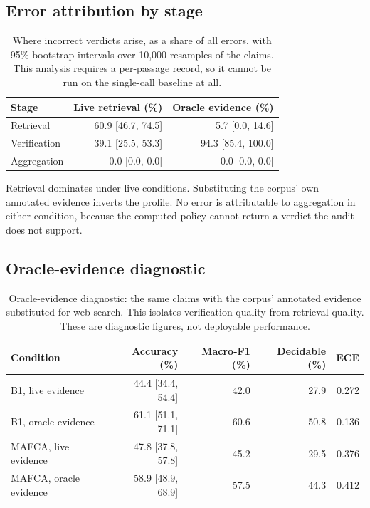 \documentclass[11pt,a4paper]{article}
\begin{document}
\subsection{Error attribution by stage}
\begin{table}[H]
\centering
\small
\caption{Where incorrect verdicts arise, as a share of all errors, with 95\% bootstrap intervals over 10,000 resamples of the claims. This analysis requires a per-passage record, so it cannot be run on the single-call baseline at all.}
\label{tab:attribution}
\begin{tabular}{@{}lrr@{}}
\toprule
\textbf{Stage} & \textbf{Live retrieval (\%)} & \textbf{Oracle evidence (\%)} \\
\midrule
Retrieval & 60.9 [46.7, 74.5] & 5.7 [0.0, 14.6] \\
Verification & 39.1 [25.5, 53.3] & 94.3 [85.4, 100.0] \\
Aggregation & 0.0 [0.0, 0.0] & 0.0 [0.0, 0.0] \\
\bottomrule
\end{tabular}
\par\vspace{2pt}\footnotesize{Retrieval dominates under live conditions. Substituting the corpus' own annotated evidence inverts the profile. No error is attributable to aggregation in either condition, because the computed policy cannot return a verdict the audit does not support.}
\end{table}
\subsection{Oracle-evidence diagnostic}
\begin{table}[H]
\centering
\small
\caption{Oracle-evidence diagnostic: the same claims with the corpus' annotated evidence substituted for web search. This isolates verification quality from retrieval quality. These are diagnostic figures, not deployable performance.}
\label{tab:oracle}
\begin{tabular}{@{}lrrrr@{}}
\toprule
\textbf{Condition} & \textbf{Accuracy (\%)} & \textbf{Macro-F1 (\%)} & \textbf{Decidable (\%)} & \textbf{ECE} \\
\midrule
B1, live evidence & 44.4 [34.4, 54.4] & 42.0 & 27.9 & 0.272 \\
B1, oracle evidence & 61.1 [51.1, 71.1] & 60.6 & 50.8 & 0.136 \\
MAFCA, live evidence & 47.8 [37.8, 57.8] & 45.2 & 29.5 & 0.376 \\
MAFCA, oracle evidence & 58.9 [48.9, 68.9] & 57.5 & 44.3 & 0.412 \\
\bottomrule
\end{tabular}
\end{table}
\end{document}
